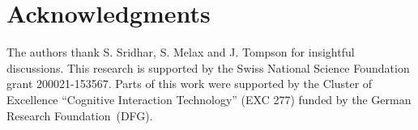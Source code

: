 \section*{Acknowledgments}
The authors thank S. Sridhar, S. Melax and J. Tompson for insightful discussions. This research is supported by the Swiss National Science Foundation grant 200021-153567. Parts of this work were supported by the Cluster of Excellence ``Cognitive Interaction Technology'' (EXC 277) funded by the German Research Foundation~(DFG).